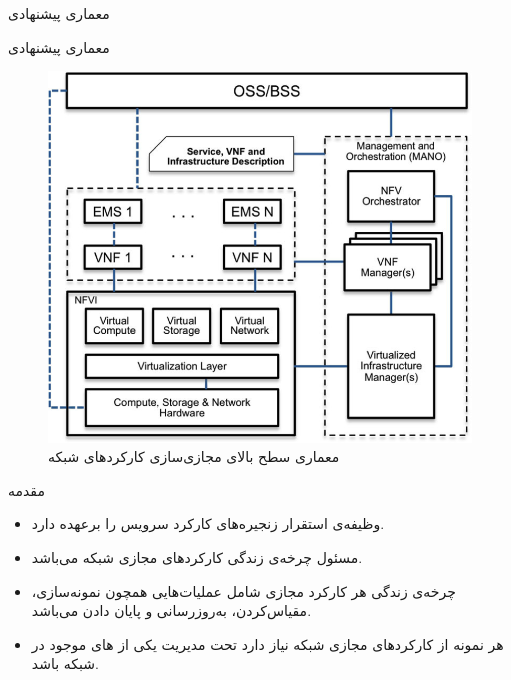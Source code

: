 \documentclass{beamer}
\makeatletter
\newcommand{\RTList}{\raggedleft\rightskip\@totalleftmargin}
\makeatother
\begin{document}
\begin{persian}
\begin{frame}{معماری پیشنهادی}
\begin{itemize}
\begin{itemize}
        \end{itemize}
    \end{itemize}
\end{frame}
\begin{frame}{معماری پیشنهادی}
    \begin{center}\begin{figure}
        \includegraphics[scale=0.5]{images/nfv-arch.png}
        \caption{معماری سطح بالای مجازی‌سازی کارکردهای شبکه}
    \end{figure}\end{center}
\end{frame}
\begin{frame}{مقدمه}
    \begin{itemize}\RTList{}
        \item {} وظیفه‌ی استقرار زنجیره‌های کارکرد سرویس را برعهده دارد.
        \item {} مسئول چرخه‌ی زندگی کارکردهای مجازی شبکه می‌باشد.
        \item چرخه‌ی زندگی هر کارکرد مجازی شامل عملیات‌هایی همچون نمونه‌سازی، مقیاس‌کردن، به‌روزرسانی و پایان دادن می‌باشد.
        \item هر نمونه از کارکردهای مجازی شبکه نیاز دارد تحت مدیریت یکی از های موجود در شبکه باشد.
    \end{itemize}

\end{frame}
\end{persian}
\end{document}
